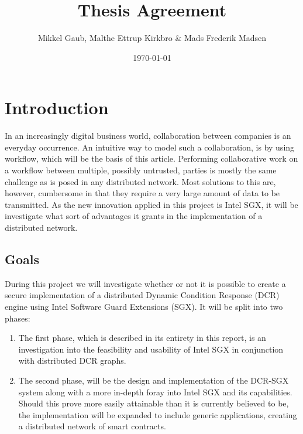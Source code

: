 \documentclass[12pt]{article}
\author{Mikkel Gaub, Malthe Ettrup Kirkbro \& Mads Frederik Madsen}
\title{Thesis Agreement}
\date{\today}
\begin{document}
\maketitle
\thispagestyle{empty}

\pagebreak

\tableofcontents

\pagebreak

	\section{Introduction}

	In an increasingly digital business world, collaboration between companies is an everyday occurrence.
	An intuitive way to model such a collaboration, is by using workflow, which will be the basis of this article.
	Performing collaborative work on a workflow between multiple, possibly untrusted, parties is mostly the same challenge as is posed in any distributed network. 
	Most solutions to this are, however, cumbersome in that they require a very large amount of data to be transmitted.
	As the new innovation applied in this project is Intel SGX, it will be investigate what sort of advantages it grants in the implementation of a distributed network.

		\subsection{Goals}

		During this project we will investigate whether or not it is possible to create a secure implementation of a distributed Dynamic Condition Response\cite{dcr-paper} (DCR) engine using Intel Software Guard Extensions\cite{intel-sgx-explained} (SGX).
		It will be split into two phases:
		\begin{enumerate}
			\item The first phase, which is described in its entirety in this report, is an investigation into the feasibility and usability of Intel SGX in conjunction with distributed DCR graphs.
			\item The second phase, will be the design and implementation of the DCR-SGX system along with a more in-depth foray into Intel SGX and its capabilities. Should this prove more easily attainable than it is currently believed to be, the implementation will be expanded to include generic applications, creating a distributed network of smart contracts\cite{smart-contracts}.
		\end{enumerate}
\end{document}
